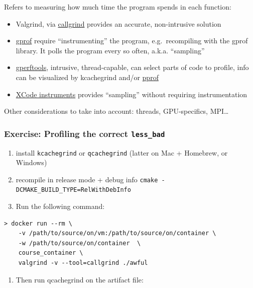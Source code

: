 Refers to measuring how much time the program spends in each function:

\begin{itemize}
\itemsep1pt\parskip0pt
\item
  Valgrind, via
  \href{http://valgrind.org/docs/manual/cl-manual.html}{callgrind}
  provides an accurate, non-intrusive solution
\item
  \href{https://sourceware.org/binutils/docs/gprof/}{gprof} require
  ``instrumenting'' the program, e.g.~recompiling with the gprof
  library. It polls the program every so often, a.k.a. ``sampling''
\item
  \href{{[}https://github.com/gperftools/gperftools}{gperftools},
  intrusive, thread-capable, can select parts of code to profile, info
  can be visualized by kcachegrind and/or
  \href{https://github.com/google/pprof}{pprof}
\item
  \href{https://developer.apple.com/library/content/documentation/DeveloperTools/Conceptual/InstrumentsUserGuide/}{XCode
  instruments} provides ``sampling'' without requiring instrumentation
\end{itemize}

Other considerations to take into account: threads, GPU-specifics,
MPI\ldots{}

\subsubsection{Exercise: Profiling the correct
\texttt{less\_bad}}\label{exercise-profiling-the-correct-lessux5fbad}

\begin{enumerate}
\def\labelenumi{\arabic{enumi}.}
\itemsep1pt\parskip0pt
\item
  install \texttt{kcachegrind} or \texttt{qcachegrind} (latter on Mac +
  Homebrew, or Windows)
\item
  recompile in release mode + debug info
  \texttt{cmake -DCMAKE\_BUILD\_TYPE=RelWithDebInfo}
\item
  Run the following command:
\end{enumerate}

\begin{verbatim}
> docker run --rm \
    -v /path/to/source/on/vm:/path/to/source/on/container \
    -w /path/to/source/on/container  \
    course_container \
    valgrind -v --tool=callgrind ./awful
\end{verbatim}

\begin{enumerate}
\def\labelenumi{\arabic{enumi}.}
\itemsep1pt\parskip0pt
\item
  Then run qcachegrind on the artifact file:
\end{enumerate}

